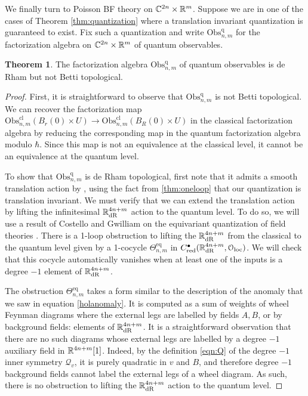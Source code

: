 \documentclass[11pt, oneside, reqno]{amsart}
\theoremstyle{definition} \newtheorem{definition}{Definition}[section]
\newtheorem{theorem}[definition]{Theorem}
\theoremstyle{definition}
\theoremstyle{remark}
\theoremstyle{definition} \newtheorem{remark}[definition]{Remark}
\theoremstyle{definition} \newtheorem{remarks}[definition]{Remarks}
\theoremstyle{definition} \newtheorem{question}[definition]{Question}
\theoremstyle{definition} \newtheorem*{note}{Note}
\theoremstyle{definition} \newtheorem{example}[definition]{Example}
\theoremstyle{definition} \newtheorem{examples}[definition]{Examples}
\newcommand{\mr}[1]{\mathrm{#1}}
\newcommand{\mc}[1]{\mathcal{#1}}
\newcommand{\obs}{\mathrm{Obs}}
\begin{document}
We finally turn to Poisson BF theory on $\mathbb C^{2n} \times \mathbb R^m$.
Suppose we are in one of the cases of Theorem \ref{thm:quantization} where a translation invariant quantization is guaranteed to exist.  
Fix such a quantization and write $\obs^{\mr{q}}_{n,m}$ for the factorization algebra on $\mathbb C^{2n} \times \mathbb R^m$ of quantum observables.

\begin{theorem} \label{quantum_lc_thm}
The factorization algebra $\obs^{\mr{q}}_{n,m}$ of quantum observables is de Rham but not Betti topological.
\end{theorem}

\begin{proof}
First, it is straightforward to observe that $\obs^{\mr{q}}_{n,m}$ is not Betti topological.  We can recover the factorization map $\obs^{\mr{cl}}_{n,m}(B_r(0) \times U) \to \obs^{\mr{cl}}_{n,m}(B_R(0) \times U)$ in the classical factorization algebra by reducing the corresponding map in the quantum factorization algebra modulo $\hbar$.  Since this map is not an equivalence at the classical level, it cannot be an equivalence at the quantum level.

To show that $\obs^{\mr{q}}_{n,m}$ is de Rham topological, first note that it admits a smooth translation action by \cite[Proposition 10.1.1.2]{Book2}, using the fact from \ref{thm:oneloop} that our quantization is translation invariant.  We must verify that we can extend the translation action by lifting the infinitesimal $\RR^{4n+m}_{\mr{dR}}$ action to the quantum level.  To do so, we will use a result of Costello and Gwilliam on the equivariant quantization of field theories \cite[Section 12.3]{Book2}.  There is a 1-loop obstruction to lifting the $\RR^{4n+m}_{\mr{dR}}$ from the classical to the quantum level given by a 1-cocycle $\Theta^{\mr{eq}}_{n,m}$ in $C^\bullet_{\mr{red}}(\RR^{4n+m}_{\mr{dR}}, \mc O_{\mr{loc}})$.  We will check that this cocycle automatically vanishes when at least one of the inputs is a degree $-1$ element of $\RR^{4n+m}_{\mr{dR}}$.

The obstruction $\Theta^{\mr{eq}}_{n,m}$ takes a form similar to the description of the anomaly that we saw in equation \ref{holanomaly}. It is computed as a sum of weights of wheel Feynman diagrams where the external legs are labelled by fields $A, B$, or by background fields: elements of $\RR^{4n+m}_{\mr{dR}}$.  It is a straightforward observation that there are no such diagrams whose external legs are labelled by a degree $-1$ auxiliary field in $\mathbb R^{4n+m}[1]$.  Indeed, by the definition \ref{eqn:Q} of the degree $-1$ inner symmetry $\mc Q_v$, it is purely quadratic in $v$ and $B$, and therefore degree $-1$ background fields cannot label the external legs of a wheel diagram.  As such, there is no obstruction to lifting the $\RR^{4n+m}_{\mr{dR}}$ action to the quantum level.
\end{proof}
\end{document}
